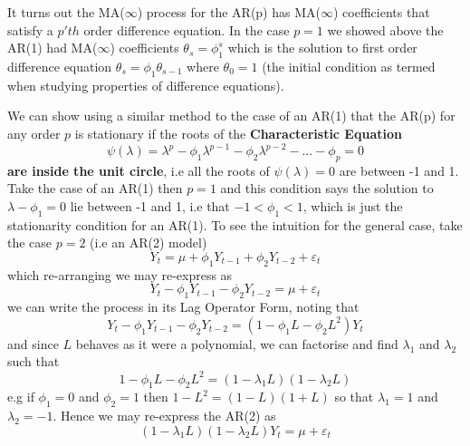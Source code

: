 \documentclass[openany]{tufte-book} %
\begin{document}
It turns out the MA($\infty$) process for the AR(p) has MA($\infty$) coefficients that satisfy a $p'th$ order difference equation. In the case $p=1$ we showed above the AR(1) had MA($\infty$) coefficients $\theta_s=\phi_1^s$ which is the solution to first order difference equation $\theta_s=\phi_1 \theta_{s-1}$  where $\theta_0=1$ (the initial condition as termed when studying properties of difference equations).

We can show using  a similar method to the case of an AR(1) that the AR(p) for any order $p$ is stationary if the roots of the \textbf{Characteristic Equation}
\begin{equation*} \psi \left( \lambda \right) =\lambda ^{p}-\phi _{1}\lambda ^{p-1}-\phi
_{2}\lambda ^{p-2}-...-\phi _{p}=0  \end{equation*}
\textbf{are inside the unit circle}, i.e all the roots of $\psi(\lambda)=0$ are between -1 and 1. Take the case of an AR(1) then $p=1$ and this condition says the solution to $\lambda-\phi_1=0$ lie between -1 and 1, i.e that $-1<\phi_1<1$, which is just the stationarity condition for an AR(1). To see the intuition for the general case, take the case $p=2$ (i.e an AR(2) model)
\begin{equation*} Y_t=\mu+ \phi_1Y_{t-1}+\phi_2 Y_{t-2} +\varepsilon_t \end{equation*}
which re-arranging we may re-express as
\begin{equation*} Y_t- \phi_1Y_{t-1}-\phi_2 Y_{t-2}=\mu+\varepsilon_t \end{equation*}
we can write the process in its Lag Operator Form, noting that
\begin{equation*} Y_t- \phi_1Y_{t-1}-\phi_2 Y_{t-2}=(1-\phi_1L-\phi_2L^2)Y_t \end{equation*}
 and since $L$ behaves as it were a polynomial, we can factorise and find $\lambda_1$ and $\lambda_2$ such that
\begin{equation*} 1-\phi_1L-\phi_2L^2=(1-\lambda_1L)(1-\lambda_2L) \end{equation*}
e.g if $\phi_1=0$ and $\phi_2=1$ then $1-L^2=(1-L)(1+L)$ so that $\lambda_1=1$ and $\lambda_2=-1$.
Hence we may re-express the AR(2) as
\begin{equation} (1-\lambda_1L)(1-\lambda_2L)Y_t=\mu+\varepsilon_t \end{equation}\label{pll}
\end{document}

